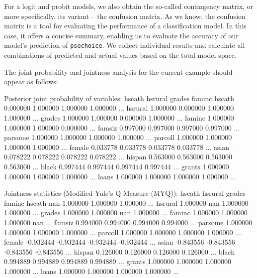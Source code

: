 For a logit and probit models, we also obtain the so-called
contingency matrix, or more specifically, its variant -- the
confusion matrix. As we know, the confusion matrix is a tool
for evaluating the performance of a classification model. 
In this case, it offers a concise summary, enabling us to
evaluate the accuracy of our model's prediction of
\texttt{psechoice}. We collect individual results and
calculate all combinations of predicted and actual values
based on the total model space. 

The joint probability  and jointness  analysis for the current
example should appear as follows:

\begin{CodeChunk}\begin{CodeOutput}
Posterior joint probability of variables:
             hscath       hsrural        grades        faminc
hscath     0.000000      1.000000      1.000000      1.000000     ...
hsrural    1.000000      0.000000      1.000000      1.000000     ...
grades     1.000000      1.000000      0.000000      1.000000     ...
faminc     1.000000      1.000000      1.000000      0.000000     ...
famsiz     0.997000      0.997000      0.997000      0.997000     ...
parsome    1.000000      1.000000      1.000000      1.000000     ...
parcoll    1.000000      1.000000      1.000000      1.000000     ...
female     0.033778      0.033778      0.033778      0.033778     ...
asian      0.078222      0.078222      0.078222      0.078222     ...
hispan     0.563000      0.563000      0.563000      0.563000     ...
black      0.997444      0.997444      0.997444      0.997444     ...
grants     1.000000      1.000000      1.000000      1.000000     ...
loans      1.000000      1.000000      1.000000      1.000000     ...
\end{CodeOutput}
\end{CodeChunk}

\begin{CodeChunk}\begin{CodeOutput}
Jointness statistics (Modified Yule's Q Measure (MYQ)):
             hscath       hsrural        grades        faminc
hscath          nan      1.000000      1.000000      1.000000     ...
hsrural    1.000000           nan      1.000000      1.000000     ...
grades     1.000000      1.000000           nan      1.000000     ...
faminc     1.000000      1.000000      1.000000           nan     ...
famsiz     0.994000      0.994000      0.994000      0.994000     ...
parsome    1.000000      1.000000      1.000000      1.000000     ...
parcoll    1.000000      1.000000      1.000000      1.000000     ...
female    -0.932444     -0.932444     -0.932444     -0.932444     ...
asian     -0.843556     -0.843556     -0.843556     -0.843556     ...
hispan     0.126000      0.126000      0.126000      0.126000     ...
black      0.994889      0.994889      0.994889      0.994889     ...
grants     1.000000      1.000000      1.000000      1.000000     ...
loans      1.000000      1.000000      1.000000      1.000000     ...
\end{CodeOutput}
\end{CodeChunk}


